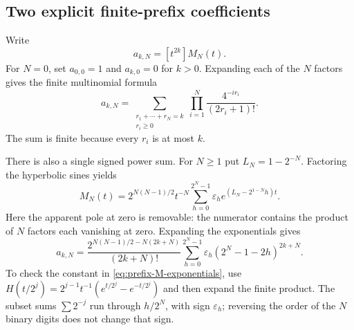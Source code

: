 \documentclass[11pt,a4paper]{article}
\numberwithin{equation}{section}
\theoremstyle{definition}
\theoremstyle{remark}
\newcommand{\eps}{\varepsilon}
\newcommand{\coeff}[2]{[#1^{#2}]}
\begin{document}
\subsection{Two explicit finite-prefix coefficients}
Write
\begin{equation}
 a_{k,N}=\coeff{t}{2k}M_N(t).
 \label{eq:prefix-coeff-definition}
\end{equation}
For $N=0$, set $a_{0,0}=1$ and $a_{k,0}=0$ for $k>0$. Expanding each of the $N$ factors gives the finite multinomial formula
\begin{equation}
 a_{k,N}=
 \sum_{\substack{r_1+\cdots+r_N=k\\r_i\ge0}}
 \prod_{i=1}^{N}\frac{4^{-ir_i}}{(2r_i+1)!}.
 \label{eq:prefix-coeff-multinomial}
\end{equation}
The sum is finite because every $r_i$ is at most $k$.

There is also a single signed power sum. For $N\ge1$ put $L_N=1-2^{-N}$. Factoring the hyperbolic sines yields
\begin{equation}
 M_N(t)=2^{N(N-1)/2}t^{-N}
 \sum_{h=0}^{2^N-1}\eps_h
        e^{(L_N-2^{1-N}h)t}.
 \label{eq:prefix-M-exponentials}
\end{equation}
Here the apparent pole at zero is removable: the numerator contains the product of $N$ factors each vanishing at zero. Expanding the exponentials gives
\begin{equation}
 \boxed{\displaystyle
 a_{k,N}=
 \frac{2^{N(N-1)/2-N(2k+N)}}{(2k+N)!}
 \sum_{h=0}^{2^N-1}\eps_h(2^N-1-2h)^{2k+N}.}
 \label{eq:prefix-coeff-power}
\end{equation}
To check the constant in \cref{eq:prefix-M-exponentials}, use
$H(t/2^j)=2^{j-1}t^{-1}(e^{t/2^j}-e^{-t/2^j})$ and then expand the finite product. The subset sums $\sum 2^{-j}$ run through $h/2^N$, with sign $\eps_h$; reversing the order of the $N$ binary digits does not change that sign.
\end{document}
